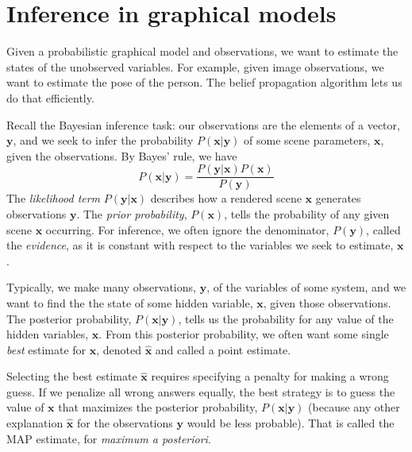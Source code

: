 \chapter{Inference in graphical models}
\label{chapt:InferenceInGraphicalModels}



Given a probabilistic graphical model and observations, we want to estimate the states of 
the unobserved variables. For example, given image
observations, we want to estimate the pose of the person.
The belief propagation algorithm lets us do that efficiently.


Recall the Bayesian inference task:  our observations are the
elements of a vector, $\mathbf{y}$, and we seek to infer the probability
$P(\mathbf{x}|\mathbf{y})$ of some scene
parameters, $\mathbf{x}$, given the observations.  By Bayes' rule, we have
\begin{equation}
P(\mathbf{x}|\mathbf{y}) = \frac{P(\mathbf{y}|\mathbf{x}) P(\mathbf{x}) }{P(\mathbf{y}) }
\end{equation}
The {\em likelihood term} $P(\mathbf{y}|\mathbf{x})$ describes how a
rendered scene $\mathbf{x}$ generates observations $\mathbf{y}$.  The {\em
prior probability}, $P(\mathbf{x})$, tells the probability of any given
scene $\mathbf{x}$ occurring.  For inference, we often ignore the denominator,
$P(\mathbf{y})$, called the {\em evidence}, as it is constant with
respect to the variables we seek to estimate, $\mathbf{x}$.

Typically, we make many observations, $\mathbf{y}$, of the variables of some system,
and we want to find the the state of some hidden variable, $\mathbf{x}$, given those
observations.  The posterior probability, $P(\mathbf{x}|\mathbf{y})$, tells
us the probability for any value of the hidden variables, $\mathbf{x}$.
From this posterior probability, we often want some single {\em best} estimate for $\mathbf{x}$,
denoted $\mathbf{\hat{x}}$ and called a point estimate.  

Selecting the best estimate $\mathbf{\hat{x}}$ requires specifying a
penalty for making a wrong guess. If we penalize all wrong answers
equally, the best strategy is to guess the value of  $\mathbf{x}$ that maximizes
the posterior probability, $P(\mathbf{x}|\mathbf{y})$ (because any other
explanation $\mathbf{\hat{x}}$ for the observations $\mathbf{y}$  would be
less probable).  That is called the MAP estimate, for {\em maximum a 
  posteriori}.

